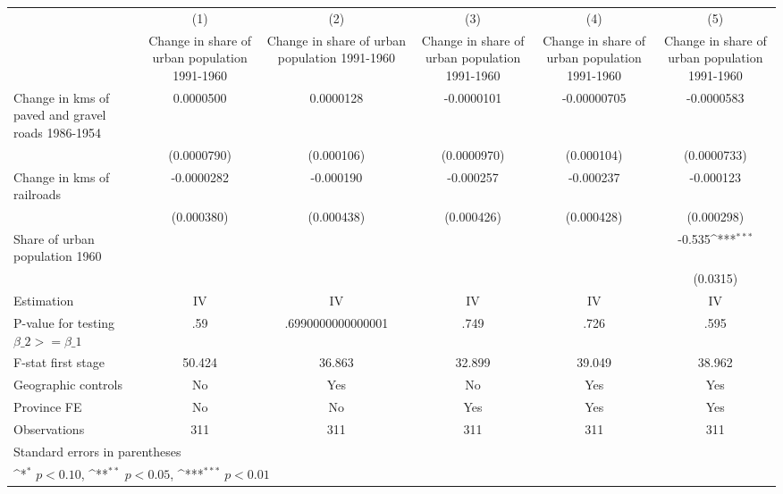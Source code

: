 {
\def\sym#1{\ifmmode^{#1}\else\(^{#1}\)\fi}
\begin{tabular}{l*{5}{c}}
\hline\hline
                    &\multicolumn{1}{c}{(1)}&\multicolumn{1}{c}{(2)}&\multicolumn{1}{c}{(3)}&\multicolumn{1}{c}{(4)}&\multicolumn{1}{c}{(5)}\\
                    &\multicolumn{1}{c}{Change in share of urban population 1991-1960}&\multicolumn{1}{c}{Change in share of urban population 1991-1960}&\multicolumn{1}{c}{Change in share of urban population 1991-1960}&\multicolumn{1}{c}{Change in share of urban population 1991-1960}&\multicolumn{1}{c}{Change in share of urban population 1991-1960}\\
\hline
Change in kms of paved and gravel roads 1986-1954&   0.0000500         &   0.0000128         &  -0.0000101         & -0.00000705         &  -0.0000583         \\
                    & (0.0000790)         &  (0.000106)         & (0.0000970)         &  (0.000104)         & (0.0000733)         \\
[1em]
Change in kms of railroads&  -0.0000282         &   -0.000190         &   -0.000257         &   -0.000237         &   -0.000123         \\
                    &  (0.000380)         &  (0.000438)         &  (0.000426)         &  (0.000428)         &  (0.000298)         \\
[1em]
Share of urban population 1960&                     &                     &                     &                     &      -0.535\sym{***}\\
                    &                     &                     &                     &                     &    (0.0315)         \\
\hline
Estimation          &          IV         &          IV         &          IV         &          IV         &          IV         \\
P-value for testing $\beta\_2 >= \beta\_1$&         .59         &.6990000000000001         &        .749         &        .726         &        .595         \\
F-stat first stage  &      50.424         &      36.863         &      32.899         &      39.049         &      38.962         \\
Geographic controls &          No         &         Yes         &          No         &         Yes         &         Yes         \\
Province FE         &          No         &          No         &         Yes         &         Yes         &         Yes         \\
Observations        &         311         &         311         &         311         &         311         &         311         \\
\hline\hline
\multicolumn{6}{l}{\footnotesize Standard errors in parentheses}\\
\multicolumn{6}{l}{\footnotesize \sym{*} \(p<0.10\), \sym{**} \(p<0.05\), \sym{***} \(p<0.01\)}\\
\end{tabular}
}
